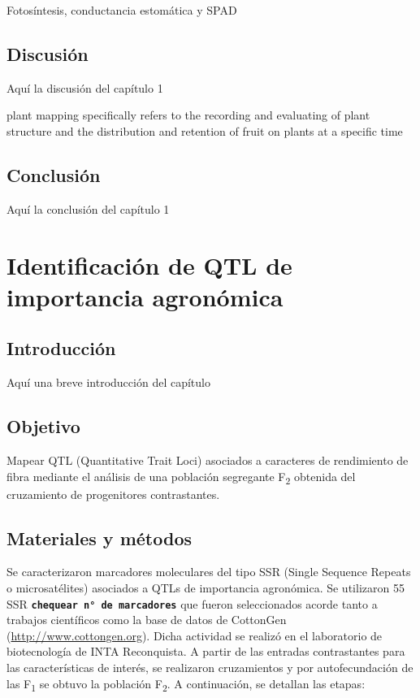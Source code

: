 \documentclass[12pt,oneside]{reedthesis}
\begin{document}
Fotosíntesis, conductancia estomática y SPAD

\section{Discusión}\label{discusiuxf3n}

Aquí la discusión del capítulo 1

plant mapping specifically refers to the recording and evaluating of plant structure and the distribution and retention of fruit on plants at a specific time \autocite{kerby2010}

\section{Conclusión}\label{conclusiuxf3n}

Aquí la conclusión del capítulo 1

\chapter{Identificación de QTL de importancia agronómica}\label{math-sci}

\section{Introducción}\label{introducciuxf3n-2}

Aquí una breve introducción del capítulo

\section{Objetivo}\label{objetivo}

Mapear QTL (Quantitative Trait Loci) asociados a caracteres de rendimiento de fibra mediante el análisis de una población segregante F\textsubscript{2} obtenida del cruzamiento de progenitores contrastantes.

\section{Materiales y métodos}\label{materiales-y-muxe9todos-1}

Se caracterizaron marcadores moleculares del tipo SSR (Single Sequence Repeats o microsatélites) asociados a QTLs de importancia agronómica. Se utilizaron 55 SSR \textbf{\texttt{chequear\ n°\ de\ marcadores}} que fueron seleccionados acorde tanto a trabajos científicos \autocite{zhang2005,shen2007,wang2007,wang2014,xia2014,wang2015,an2010,liu2012,qin2015,shi2015,su2016,zhang2016,ademe2017,liu2017,iqbal2017,li2017,baytar2018,liu2018} como la base de datos de CottonGen (\url{http://www.cottongen.org}). Dicha actividad se realizó en el laboratorio de biotecnología de INTA Reconquista. A partir de las entradas contrastantes para las características de interés, se realizaron cruzamientos y por autofecundación de las F\textsubscript{1} se obtuvo la población F\textsubscript{2}. A continuación, se detallan las etapas:
\end{document}
